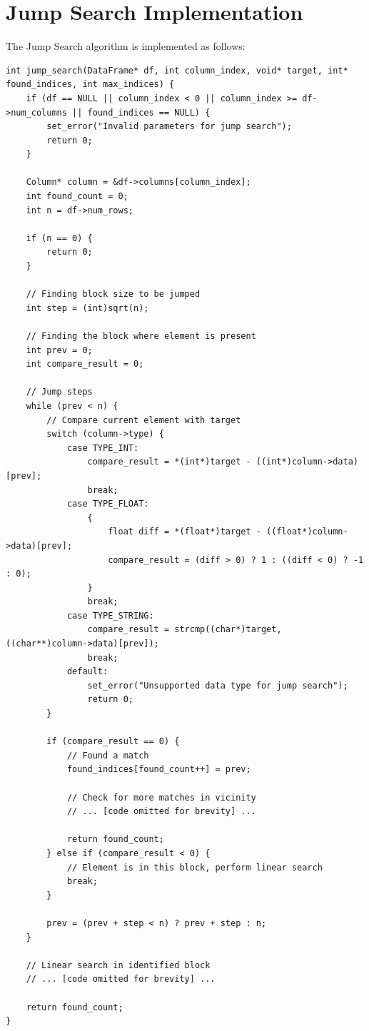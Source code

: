 \section{Jump Search Implementation}

The Jump Search algorithm is implemented as follows:

\begin{lstlisting}[style=c]
int jump_search(DataFrame* df, int column_index, void* target, int* found_indices, int max_indices) {
    if (df == NULL || column_index < 0 || column_index >= df->num_columns || found_indices == NULL) {
        set_error("Invalid parameters for jump search");
        return 0;
    }

    Column* column = &df->columns[column_index];
    int found_count = 0;
    int n = df->num_rows;
    
    if (n == 0) {
        return 0;
    }
    
    // Finding block size to be jumped
    int step = (int)sqrt(n);
    
    // Finding the block where element is present
    int prev = 0;
    int compare_result = 0;
    
    // Jump steps
    while (prev < n) {
        // Compare current element with target
        switch (column->type) {
            case TYPE_INT:
                compare_result = *(int*)target - ((int*)column->data)[prev];
                break;
            case TYPE_FLOAT:
                {
                    float diff = *(float*)target - ((float*)column->data)[prev];
                    compare_result = (diff > 0) ? 1 : ((diff < 0) ? -1 : 0);
                }
                break;
            case TYPE_STRING:
                compare_result = strcmp((char*)target, ((char**)column->data)[prev]);
                break;
            default:
                set_error("Unsupported data type for jump search");
                return 0;
        }
        
        if (compare_result == 0) {
            // Found a match
            found_indices[found_count++] = prev;
            
            // Check for more matches in vicinity
            // ... [code omitted for brevity] ...
            
            return found_count;
        } else if (compare_result < 0) {
            // Element is in this block, perform linear search
            break;
        }
        
        prev = (prev + step < n) ? prev + step : n;
    }
    
    // Linear search in identified block
    // ... [code omitted for brevity] ...
    
    return found_count;
}
\end{lstlisting}

